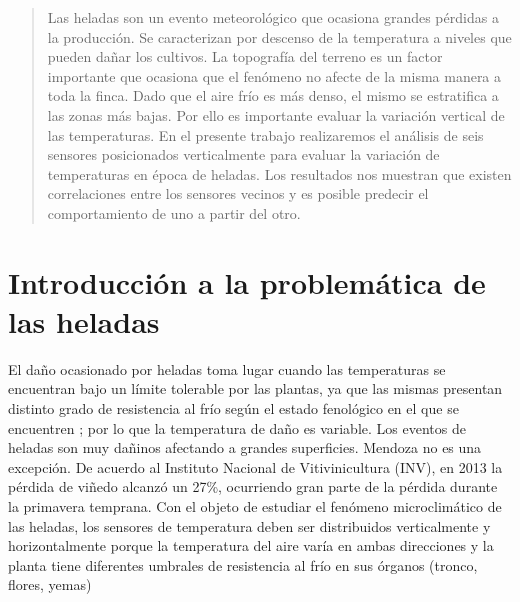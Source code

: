\documentclass[final,a4paper]{llncs}
\begin{document}
\begin{abstract}

Las heladas son un evento meteorológico que ocasiona grandes pérdidas a la producción.
Se caracterizan por descenso de la temperatura a niveles que pueden dañar los cultivos.
La topografía del terreno es un factor importante que ocasiona que el fenómeno no 
afecte de la misma manera a toda la finca. Dado que el aire frío es más denso, 
el mismo se estratifica a las zonas más bajas. Por ello es importante evaluar la 
variación vertical de las temperaturas.
En el presente trabajo realizaremos el análisis de seis sensores posicionados verticalmente
para evaluar la variación de temperaturas en época de heladas.
Los resultados nos muestran que existen correlaciones entre los sensores vecinos y
 es posible predecir el comportamiento de uno a partir del otro.

\end{abstract}



\section{Introducci\'{o}n a la problem\'{a}tica de las heladas}

El daño ocasionado por heladas toma lugar cuando las temperaturas 
se encuentran bajo un límite tolerable por las plantas, ya que las 
mismas presentan distinto grado de resistencia al frío según el estado
fenológico en el que se encuentren \cite{snyder2005frost}; por lo
que la temperatura de daño es variable. Los eventos de heladas son 
muy dañinos afectando a grandes superficies. Mendoza no es una excepción.
De acuerdo al Instituto Nacional de Vitivinicultura (INV), 
en 2013 la pérdida de viñedo alcanzó un 27\%\cite{inv-news}, ocurriendo 
gran parte de la pérdida durante la primavera temprana.
Con el objeto de estudiar el fenómeno microclimático de las heladas,
los sensores de temperatura deben ser distribuidos verticalmente y horizontalmente
porque la temperatura del aire varía en ambas direcciones y la planta tiene
diferentes umbrales de resistencia al frío en sus órganos (tronco, flores, yemas)
\end{document}
